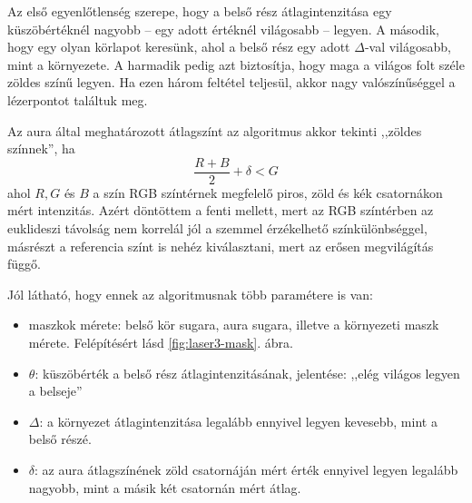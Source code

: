 \documentclass[a4paper,oneside]{article}
\begin{document}
Az első egyenlőtlenség szerepe, hogy a belső rész átlagintenzitása egy küszöbértéknél nagyobb -- egy adott értéknél világosabb -- legyen. A második, hogy egy olyan körlapot keresünk, ahol a belső rész egy adott $\Delta$-val világosabb, mint a környezete. A harmadik pedig azt biztosítja, hogy maga a világos folt széle zöldes színű legyen. Ha ezen három feltétel teljesül, akkor nagy valószínűséggel a lézerpontot találtuk meg.

Az aura által meghatározott átlagszínt az algoritmus akkor tekinti ,,zöldes színnek'', ha
\[\frac{R + B}{2} + \delta < G\]
ahol $R, G$ és $B$ a szín RGB színtérnek megfelelő piros, zöld és kék csatornákon mért intenzitás. Azért döntöttem a fenti mellett, mert az RGB színtérben az euklideszi távolság nem korrelál jól a szemmel érzékelhető színkülönbséggel, másrészt a referencia színt is nehéz kiválasztani, mert az erősen megvilágítás függő.

Jól látható, hogy ennek az algoritmusnak több paramétere is van:
\begin{itemize}[itemsep=0pt]
\item maszkok mérete: belső kör sugara, aura sugara, illetve a környezeti maszk mérete. Felépítésért lásd \ref{fig:laser3-mask}. ábra.
\item $\theta$: küszöbérték a belső rész átlagintenzitásának, jelentése: ,,elég világos legyen a belseje''
\item $\Delta$: a környezet átlagintenzitása legalább ennyivel legyen kevesebb, mint a belső részé.
\item $\delta$: az aura átlagszínének zöld csatornáján mért érték ennyivel legyen legalább nagyobb, mint a másik két csatornán mért átlag.
\end{itemize}
\end{document}
